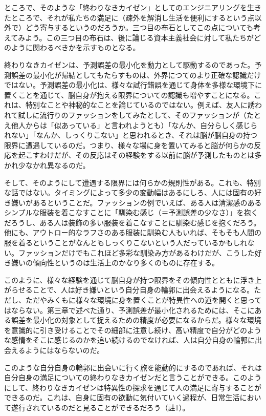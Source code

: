 ところで、そのような「終わりなきカイゼン」としてのエンジニアリングを生きたところで、それが私たちの満足に（疎外を解消し生活を便利にするという点以外で）どう寄与するというのだろうか。三つ目の布石としてこの点についても考えてみよう。この三つ目の布石は、後に論じる資本主義社会に対して私たちがどのように関わるべきかを示すものとなる。

終わりなきカイゼンは、予測誤差の最小化を動力として駆動するのであった。予測誤差の最小化が帰結としてもたらすものは、外界につてのより正確な認識だけではない。予測誤差の最小化は、様々な試行錯誤を通じて身体を多様な環境下に置くことを通じて、脳自身が抱える限界についての認識も増やすことになる。これは、特別なことや神秘的なことを論じているのではない。例えば、友人に誘われて試しに流行りのファッションをしてみたとして、そのファッションが（たとえ他人からは「似あっている」と言われようとも）「なんか、自分らしく感じられない」「なんか、しっくりこない」と思われるとき、それは脳が脳自身の持つ限界に遭遇しているのだ。つまり、様々な場に身を置いてみると脳が何らかの反応を起こすわけだが、その反応はその経験をする以前に脳が予測したものとは多かれ少なかれ異なるのだ。

そして、そのようにして遭遇する限界には何らかの規則性がある。これも、特別な話ではない。タイミングによって多少の変動幅はあるにしろ、人には固有の好き嫌いがあるということだ。ファッションの例でいえば、ある人は清潔感のあるシンプルな服装を着こなすことに「馴染む感じ（＝予測誤差の少なさ）」を抱くだろうし、ある人は装飾の多い服装を着こなすことに馴染む感じを抱くだろう。他にも、アウトロー的なラフさのある服装に馴染む人もいれば、そもそも人間の服を着るということがなんともしっくりこないという人だっているかもしれない。ファッションだけでもこれほど多彩な馴染み方があるわけだが、こうした好き嫌いの傾向性というのは生活上のかなり多くのものに存在する。

このように、様々な経験を通じて脳自身が持つ限界をその傾向性とともに浮き上がらせることで、人は好き嫌いという自分自身の輪郭に出会えるようになる。ただし、ただやみくもに様々な環境に身を置くことが特異性への道を開くと思ってはならない。第三章で述べた通り、予測誤差が最小化されるためには、そこにある誤差を最小化の対象として捉えるための精度が必要になるからだ。様々な環境を意識的に引き受けることでその細部に注意し続け、高い精度で自分がどのような感情をそこに感じるのかを追い続けるのでなければ、人は自分自身の輪郭に出会えるようにはならないのだ。

このような自分自身の輪郭に出会いに行く旅を能動的にするのであれば、それは自分自身の満足についての終わりなきカイゼンだと言うことができる。このようにして、終わりなきカイゼンは特異性の探求を通じて人の満足に寄与することができるのだ。これは、自身に固有の欲動に気付いていく過程が、日常生活において遂行されているのだと見ることができるだろう（註1）。

